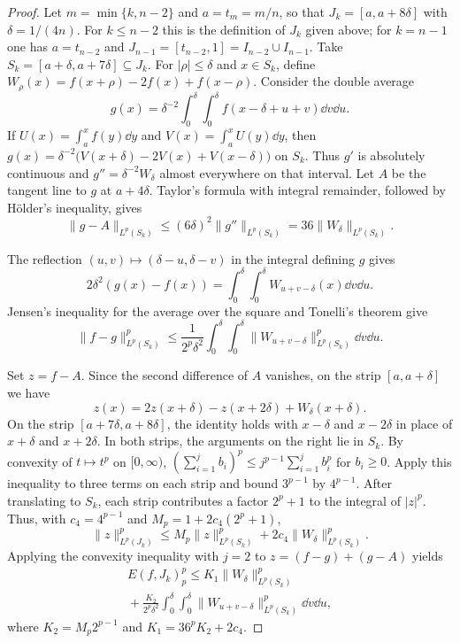 \documentclass[11pt,a4paper]{article}
\begin{document}
\begin{proof}
Let $m=\min\{k,n-2\}$ and $a=t_m=m/n$, so that $J_k=[a,a+8\delta]$ with $\delta=1/(4n)$. For $k\le n-2$ this is the definition of $J_k$ given above; for $k=n-1$ one has $a=t_{n-2}$ and $J_{n-1}=[t_{n-2},1]=I_{n-2}\cup I_{n-1}$. Take $S_k=[a+\delta,a+7\delta]\subseteq J_k$. For $|\rho|\le\delta$ and $x\in S_k$, define $W_\rho(x)=f(x+\rho)-2f(x)+f(x-\rho)$. Consider the double average
\[
 g(x)=\delta^{-2}\int_0^\delta\!\!\int_0^\delta
            f(x-\delta+u+v)\dd v\dd u.
\]
If $U(x)=\int_a^x f(y)\dd y$ and $V(x)=\int_a^x U(y)\dd y$, then
$g(x)=\delta^{-2}\big(V(x+\delta)-2V(x)+V(x-\delta)\big)$ on $S_k$.
Thus $g'$ is absolutely continuous and $g''=\delta^{-2}W_\delta$ almost everywhere on that interval. Let $A$ be the tangent line to $g$ at $a+4\delta$. Taylor's formula with integral remainder, followed by Hölder's inequality, gives
\[
 \|g-A\|_{L^p(S_k)}
 \le (6\delta)^2\|g''\|_{L^p(S_k)}
 =36\|W_\delta\|_{L^p(S_k)} .
\]

The reflection $(u,v)\mapsto(\delta-u,\delta-v)$ in the integral defining $g$ gives
\[
 2\delta^2(g(x)-f(x))
 =\int_0^\delta\!\!\int_0^\delta W_{u+v-\delta}(x)\dd v\dd u .
\]
Jensen's inequality for the average over the square and Tonelli's theorem give
\[
 \|f-g\|_{L^p(S_k)}^p
 \le \frac{1}{2^p\delta^2}\int_0^\delta\!\!\int_0^\delta
        \|W_{u+v-\delta}\|_{L^p(S_k)}^p\dd v\dd u .
\]

Set $z=f-A$. Since the second difference of $A$ vanishes, on the strip $[a,a+\delta]$ we have
\[
 z(x)=2z(x+\delta)-z(x+2\delta)+W_\delta(x+\delta).
\]
On the strip $[a+7\delta,a+8\delta]$, the identity holds with $x-\delta$ and $x-2\delta$ in place of $x+\delta$ and $x+2\delta$. In both strips, the arguments on the right lie in $S_k$. By convexity of $t\mapsto t^p$ on $[0,\infty)$,
$(\sum_{i=1}^j b_i)^p\le j^{p-1}\sum_{i=1}^j b_i^p$ for $b_i\ge0$. Apply this inequality to three terms on each strip and bound $3^{p-1}$ by $4^{p-1}$. After translating to $S_k$, each strip contributes a factor $2^p+1$ to the integral of $|z|^p$. Thus, with $c_4=4^{p-1}$ and $M_p=1+2c_4(2^p+1)$,
\[
 \|z\|_{L^p(J_k)}^p
 \le M_p\|z\|_{L^p(S_k)}^p+2c_4\|W_\delta\|_{L^p(S_k)}^p.
\]
Applying the convexity inequality with $j=2$ to $z=(f-g)+(g-A)$ yields
\begin{multline*}
 E(f,J_k)_p^p\le
 K_1\|W_\delta\|_{L^p(S_k)}^p\\
 {}+\frac{K_2}{2^p\delta^2}\int_0^\delta\!\!\int_0^\delta
 \|W_{u+v-\delta}\|_{L^p(S_k)}^p\dd v\dd u ,
\end{multline*}
where $K_2=M_p2^{p-1}$ and $K_1=36^pK_2+2c_4$.


\end{proof}
\end{document}
